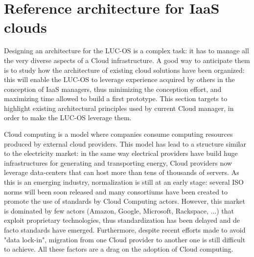 \section{Reference architecture for IaaS clouds}
\label{sec:moreno}

Designing an architecture for the LUC-OS is a complex task: it has to manage all
the very diverse aspects of a Cloud infrastructure. A good way to anticipate 
them is to study how the architecture of existing cloud solutions have been 
organized: this will enable the LUC-OS to leverage experience acquired by others
in the conception of IaaS managers, thus minimizing the conception effort, and
maximizing time allowed to build a first prototype. This section targets to 
highlight existing architectural principles used by current Cloud manager, in 
order to make the LUC-OS leverage them.


Cloud computing is a model where companies consume computing resources produced 
by external cloud providers. This model has lead to a structure similar to the 
electricity market: in the same way electrical providers have build huge 
infrastructures for generating and transporting energy, Cloud providers now 
leverage data-centers that can host more than tens of thousands of servers. As 
this is an emerging industry, normalization is still at an early stage: several 
ISO norms will been soon released and many consortiums have been created to 
promote the use of standards by Cloud Computing actors. However, this market is 
dominated by few actors (Amazon, Google, Microsoft, Rackspace, ...) that exploit
proprietary technologies, thus standardization has been delayed and de facto 
standards have emerged. Furthermore, despite recent efforts made to avoid "data
lock-in", migration from one Cloud provider to another one is still difficult to 
achieve. All these factors are a drag on the adoption of Cloud computing.


